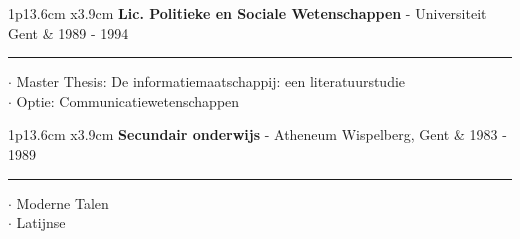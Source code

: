 \documentclass[10pt,A4]{article}
\newcommand{\cvevent}[5]
{

\begin{tabular*}{1\textwidth}{p{13.6cm}  x{3.9cm}}
	\textbf{#2} - \textcolor{bgcol}{#3} &   \vspace{2.5pt}\textcolor{sectcol}{#1}
\end{tabular*}

\vspace{-8pt}
\textcolor{softcol}{\hrule}
\vspace{6pt}

  $\cdot$ #4\\[3pt]
  $\cdot$ #5\\[6pt]

}
\newcommand{\mystrut}{\rule[-.3\baselineskip]{0pt}{\baselineskip}}
\begin{document}
\cvevent{1989 - 1994}{Lic. Politieke en Sociale Wetenschappen}{Universiteit Gent}{Master Thesis: De informatiemaatschappij: een literatuurstudie}{Optie: Communicatiewetenschappen}


%
\cvevent{1983 - 1989}{Secundair onderwijs}{Atheneum Wispelberg, Gent}{Moderne Talen}{Latijnse}






\null
\vspace*{\fill}
\hspace{-0.25\linewidth}\colorbox{bgcol}{\makebox[1.5\linewidth][c]{\mystrut \small \textcolor{white}{www.colpaert.org} $\cdot$ \textcolor{white}{github.com/koencolpaert}}}




%
%
%
%
%
%
\end{document}
